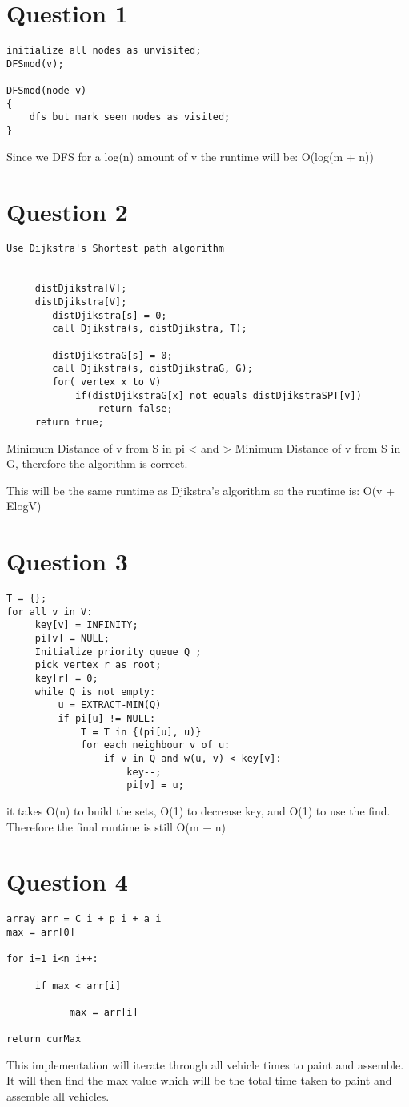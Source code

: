 \documentclass[11pt]{book}
\begin{document}
\maketitle


\section*{Question 1}
\begin{lstlisting}
initialize all nodes as unvisited;
DFSmod(v);

DFSmod(node v)
{
	dfs but mark seen nodes as visited;
}
\end{lstlisting}
Since we DFS for a log(n) amount of v the runtime will be: O(log(m + n))

\section*{Question 2}
\begin{lstlisting}
Use Dijkstra's Shortest path algorithm


     distDjikstra[V];
	 distDjikstra[V];
        distDjikstra[s] = 0;
        call Djikstra(s, distDjikstra, T);
     
        distDjikstraG[s] = 0;
        call Djikstra(s, distDjikstraG, G);
        for( vertex x to V)
            if(distDjikstraG[x] not equals distDjikstraSPT[v])
                return false;
     return true; 
\end{lstlisting}
Minimum Distance of v from S in pi  < and > Minimum Distance of v from S in G, therefore the algorithm
is correct.

This will be the same runtime as Djikstra's algorithm so the runtime is: O(v + ElogV)


\section*{Question 3}
\begin{lstlisting}
T = {};
for all v in V:
	 key[v] = INFINITY;
	 pi[v] = NULL;
	 Initialize priority queue Q ;
	 pick vertex r as root;
	 key[r] = 0;
	 while Q is not empty:
		 u = EXTRACT-MIN(Q)
		 if pi[u] != NULL:
			 T = T in {(pi[u], u)}
			 for each neighbour v of u:
				 if v in Q and w(u, v) < key[v]:
					 key--;
					 pi[v] = u;
\end{lstlisting}
it takes O(n) to build the sets, O(1) to decrease key, and O(1) to use the find.
Therefore the final runtime is still O(m + n)

\section*{Question 4}
\begin{lstlisting}
array arr = C_i + p_i + a_i
max = arr[0]

for i=1 i<n i++:

     if max < arr[i]

           max = arr[i]

return curMax
\end{lstlisting}
This implementation will iterate through all vehicle times to paint and assemble. It will then find 
the max value which will be the total time taken to paint and assemble all vehicles.
\end{document}
